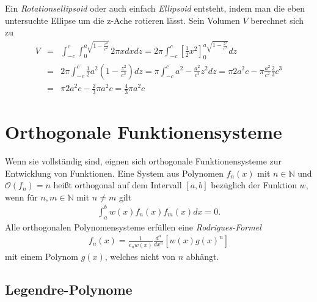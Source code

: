\documentclass{book}
\begin{document}
%
Ein \textit{Rotationsellipsoid} oder auch einfach \textit{Ellipsoid} entsteht, indem man die eben untersuchte Ellipse um die z-Ache rotieren lässt. Sein Volumen $V$ berechnet sich zu
%
\begin{eqnarray}
V & = & \int_{ - c}^{c}\int_{0}^{a\sqrt{1 - \frac{z^2}{c^2}}}2\pi xdxdz = 2\pi\int_{ - c}^{c}\left[\frac{1}{2}x^2\right]_0^{a\sqrt{1 - \frac{z^2}{c^2}}}dz\nonumber\\
& = & 2\pi\int_{ - c}^{c}\frac{1}{2}a^2\left(1 - \frac{z^2}{c^2}\right)dz = \pi\int_{ - c}^{c}a^2 - \frac{a^2}{c^2}z^2dz = \pi 2a^2c - \pi\frac{a^2}{c^2}\frac{2}{3}c^3\nonumber\\
& = & \pi 2a^2c - \frac{2}{3}\pi a^2c = \frac{4}{3}\pi a^2c\label{eq:vol_rot_ellipsoid}
\end{eqnarray}

\section{Orthogonale Funktionensysteme}
\label{sec:orthogonale_funktionensysteme}

Wenn sie vollständig sind, eignen sich orthogonale Funktionensysteme zur Entwicklung von Funktionen. Eine System aus Polynomen $f_n\left(x\right)$ mit $n\in\mathbb{N}$ und $\mathcal{O}\left(f_n\right) = n$ heißt orthogonal auf dem Intervall $\left[a, b\right]$ bezüglich der Funktion $w$, wenn für $n, m\in\mathbb{N}$ mit $n\not = m$ gilt
%
\begin{eqnarray}
\int_{a}^{b}w\left(x\right)f_n\left(x\right)f_m\left(x\right)dx = 0.
\end{eqnarray}
%
Alle orthogonalen Polynomensysteme erfüllen eine \textit{Rodrigues-Formel}
%
\begin{eqnarray}
f_n\left(x\right) = \frac{1}{e_nw\left(x\right)}\frac{d^n}{dx^n}\left[w\left(x\right)g\left(x\right)^n\right]
\end{eqnarray}
%
mit einem Polynom $g\left(x\right)$, welches nicht von $n$ abhängt.

\subsection{Legendre-Polynome}
\label{sec:legendrepolynome}
\end{document}
